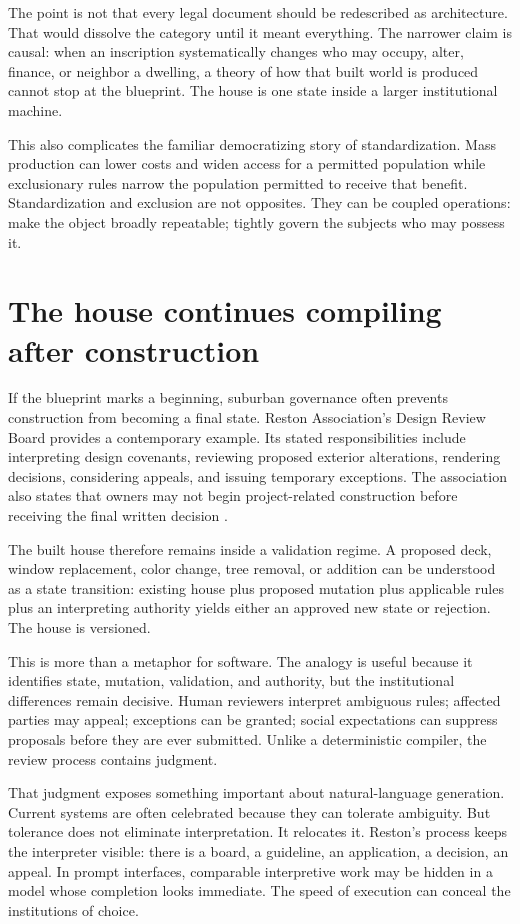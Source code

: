 \documentclass[11pt]{article}
\begin{document}
The point is not that every legal document should be redescribed as architecture. That would dissolve the category until it meant everything. The narrower claim is causal: when an inscription systematically changes who may occupy, alter, finance, or neighbor a dwelling, a theory of how that built world is produced cannot stop at the blueprint. The house is one state inside a larger institutional machine.

This also complicates the familiar democratizing story of standardization. Mass production can lower costs and widen access for a permitted population while exclusionary rules narrow the population permitted to receive that benefit. Standardization and exclusion are not opposites. They can be coupled operations: make the object broadly repeatable; tightly govern the subjects who may possess it.

\section{The house continues compiling after construction}
If the blueprint marks a beginning, suburban governance often prevents construction from becoming a final state. Reston Association's Design Review Board provides a contemporary example. Its stated responsibilities include interpreting design covenants, reviewing proposed exterior alterations, rendering decisions, considering appeals, and issuing temporary exceptions. The association also states that owners may not begin project-related construction before receiving the final written decision \citep{restonDesignReview}.

The built house therefore remains inside a validation regime. A proposed deck, window replacement, color change, tree removal, or addition can be understood as a state transition: existing house plus proposed mutation plus applicable rules plus an interpreting authority yields either an approved new state or rejection. The house is versioned.

This is more than a metaphor for software. The analogy is useful because it identifies state, mutation, validation, and authority, but the institutional differences remain decisive. Human reviewers interpret ambiguous rules; affected parties may appeal; exceptions can be granted; social expectations can suppress proposals before they are ever submitted. Unlike a deterministic compiler, the review process contains judgment.

That judgment exposes something important about natural-language generation. Current systems are often celebrated because they can tolerate ambiguity. But tolerance does not eliminate interpretation. It relocates it. Reston's process keeps the interpreter visible: there is a board, a guideline, an application, a decision, an appeal. In prompt interfaces, comparable interpretive work may be hidden in a model whose completion looks immediate. The speed of execution can conceal the institutions of choice.
\end{document}
